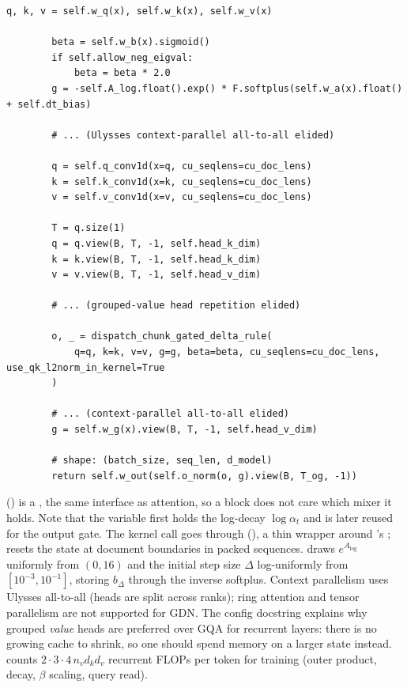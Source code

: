 \begin{lstlisting}[caption={Excerpt from \texttt{repos/\allowbreak allenai\_\_OLMo-core/\allowbreak src/\allowbreak olmo\_core/\allowbreak nn/\allowbreak attention/\allowbreak recurrent.py} (\texttt{GatedDeltaNet.forward}).},label={lst:c12-olmo-gdn}]
        q, k, v = self.w_q(x), self.w_k(x), self.w_v(x)

        beta = self.w_b(x).sigmoid()
        if self.allow_neg_eigval:
            beta = beta * 2.0
        g = -self.A_log.float().exp() * F.softplus(self.w_a(x).float() + self.dt_bias)

        # ... (Ulysses context-parallel all-to-all elided)

        q = self.q_conv1d(x=q, cu_seqlens=cu_doc_lens)
        k = self.k_conv1d(x=k, cu_seqlens=cu_doc_lens)
        v = self.v_conv1d(x=v, cu_seqlens=cu_doc_lens)

        T = q.size(1)
        q = q.view(B, T, -1, self.head_k_dim)
        k = k.view(B, T, -1, self.head_k_dim)
        v = v.view(B, T, -1, self.head_v_dim)

        # ... (grouped-value head repetition elided)

        o, _ = dispatch_chunk_gated_delta_rule(
            q=q, k=k, v=v, g=g, beta=beta, cu_seqlens=cu_doc_lens, use_qk_l2norm_in_kernel=True
        )

        # ... (context-parallel all-to-all elided)
        g = self.w_g(x).view(B, T, -1, self.head_v_dim)

        # shape: (batch_size, seq_len, d_model)
        return self.w_out(self.o_norm(o, g).view(B, T_og, -1))
\end{lstlisting}

\begin{implnote}[title={In the code: the Gated DeltaNet integration in OLMo-core}]
 () is a
, the same interface as attention, so a block does not care which mixer it
holds. Note that the variable  first holds the log-decay $\log\alpha_t$ and is later reused
for the output gate. The kernel call goes through 
(), a thin wrapper around \fla{}'s
;  resets the state at document boundaries in packed
sequences.  draws $e^{A_{\log}}$ uniformly from $(0,16)$ and the initial step
size $\Delta$ log-uniformly from $[10^{-3}, 10^{-1}]$, storing $b_\Delta$ through the inverse
softplus. Context parallelism uses Ulysses all-to-all (heads are split across ranks); ring
attention and tensor parallelism are not supported for GDN. The config docstring explains why
grouped \emph{value} heads are preferred over GQA for recurrent layers: there is no growing cache
to shrink, so one should spend memory on a larger state instead.  counts
$2\cdot3\cdot4\,n_vd_kd_v$ recurrent FLOPs per token for training (outer product, decay, $\beta$
scaling, query read).
\end{implnote}

